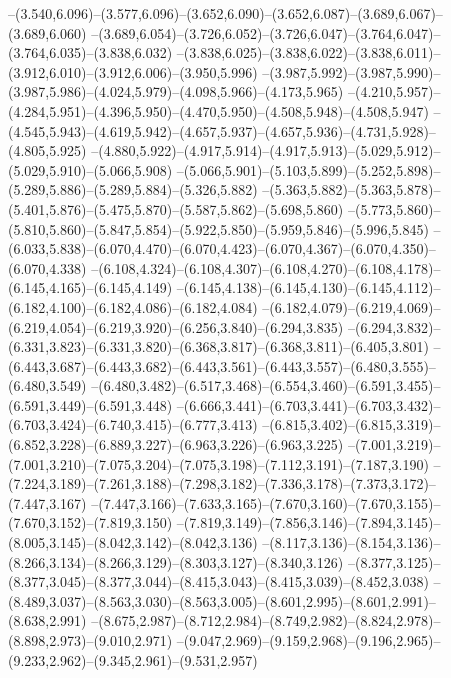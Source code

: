   --(3.540,6.096)--(3.577,6.096)--(3.652,6.090)--(3.652,6.087)--(3.689,6.067)--(3.689,6.060)%
  --(3.689,6.054)--(3.726,6.052)--(3.726,6.047)--(3.764,6.047)--(3.764,6.035)--(3.838,6.032)%
  --(3.838,6.025)--(3.838,6.022)--(3.838,6.011)--(3.912,6.010)--(3.912,6.006)--(3.950,5.996)%
  --(3.987,5.992)--(3.987,5.990)--(3.987,5.986)--(4.024,5.979)--(4.098,5.966)--(4.173,5.965)%
  --(4.210,5.957)--(4.284,5.951)--(4.396,5.950)--(4.470,5.950)--(4.508,5.948)--(4.508,5.947)%
  --(4.545,5.943)--(4.619,5.942)--(4.657,5.937)--(4.657,5.936)--(4.731,5.928)--(4.805,5.925)%
  --(4.880,5.922)--(4.917,5.914)--(4.917,5.913)--(5.029,5.912)--(5.029,5.910)--(5.066,5.908)%
  --(5.066,5.901)--(5.103,5.899)--(5.252,5.898)--(5.289,5.886)--(5.289,5.884)--(5.326,5.882)%
  --(5.363,5.882)--(5.363,5.878)--(5.401,5.876)--(5.475,5.870)--(5.587,5.862)--(5.698,5.860)%
  --(5.773,5.860)--(5.810,5.860)--(5.847,5.854)--(5.922,5.850)--(5.959,5.846)--(5.996,5.845)%
  --(6.033,5.838)--(6.070,4.470)--(6.070,4.423)--(6.070,4.367)--(6.070,4.350)--(6.070,4.338)%
  --(6.108,4.324)--(6.108,4.307)--(6.108,4.270)--(6.108,4.178)--(6.145,4.165)--(6.145,4.149)%
  --(6.145,4.138)--(6.145,4.130)--(6.145,4.112)--(6.182,4.100)--(6.182,4.086)--(6.182,4.084)%
  --(6.182,4.079)--(6.219,4.069)--(6.219,4.054)--(6.219,3.920)--(6.256,3.840)--(6.294,3.835)%
  --(6.294,3.832)--(6.331,3.823)--(6.331,3.820)--(6.368,3.817)--(6.368,3.811)--(6.405,3.801)%
  --(6.443,3.687)--(6.443,3.682)--(6.443,3.561)--(6.443,3.557)--(6.480,3.555)--(6.480,3.549)%
  --(6.480,3.482)--(6.517,3.468)--(6.554,3.460)--(6.591,3.455)--(6.591,3.449)--(6.591,3.448)%
  --(6.666,3.441)--(6.703,3.441)--(6.703,3.432)--(6.703,3.424)--(6.740,3.415)--(6.777,3.413)%
  --(6.815,3.402)--(6.815,3.319)--(6.852,3.228)--(6.889,3.227)--(6.963,3.226)--(6.963,3.225)%
  --(7.001,3.219)--(7.001,3.210)--(7.075,3.204)--(7.075,3.198)--(7.112,3.191)--(7.187,3.190)%
  --(7.224,3.189)--(7.261,3.188)--(7.298,3.182)--(7.336,3.178)--(7.373,3.172)--(7.447,3.167)%
  --(7.447,3.166)--(7.633,3.165)--(7.670,3.160)--(7.670,3.155)--(7.670,3.152)--(7.819,3.150)%
  --(7.819,3.149)--(7.856,3.146)--(7.894,3.145)--(8.005,3.145)--(8.042,3.142)--(8.042,3.136)%
  --(8.117,3.136)--(8.154,3.136)--(8.266,3.134)--(8.266,3.129)--(8.303,3.127)--(8.340,3.126)%
  --(8.377,3.125)--(8.377,3.045)--(8.377,3.044)--(8.415,3.043)--(8.415,3.039)--(8.452,3.038)%
  --(8.489,3.037)--(8.563,3.030)--(8.563,3.005)--(8.601,2.995)--(8.601,2.991)--(8.638,2.991)%
  --(8.675,2.987)--(8.712,2.984)--(8.749,2.982)--(8.824,2.978)--(8.898,2.973)--(9.010,2.971)%
  --(9.047,2.969)--(9.159,2.968)--(9.196,2.965)--(9.233,2.962)--(9.345,2.961)--(9.531,2.957)%
